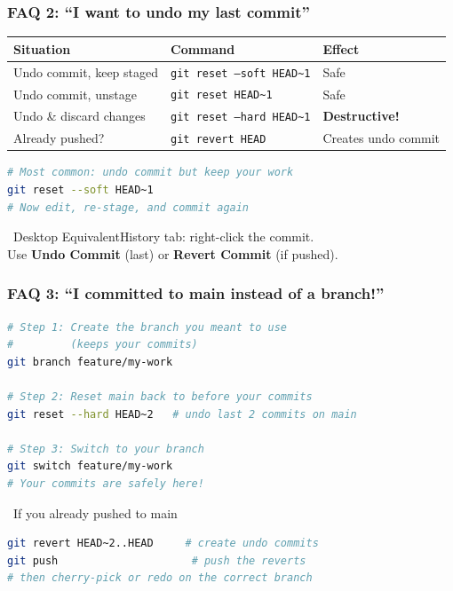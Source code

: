 \documentclass{beamer}
\newcommand{\desktoptip}[1]{\begin{block}{\faMousePointer\ Desktop Equivalent}#1\end{block}}
\begin{document}
\begin{frame}[fragile]
\frametitle{FAQ 2: ``I want to undo my last commit''}

\begin{table}[h]
\centering
\tiny
\begin{tabular}{p{}p{}p{}}
\toprule
\textbf{Situation} & \textbf{Command} & \textbf{Effect} \\
\midrule
Undo commit, keep staged & \texttt{git reset --soft HEAD\textasciitilde1} & Safe \\
Undo commit, unstage & \texttt{git reset HEAD\textasciitilde1} & Safe \\
Undo \& discard changes & \texttt{git reset --hard HEAD\textasciitilde1} & \textbf{Destructive!} \\
Already pushed? & \texttt{git revert HEAD} & Creates undo commit \\
\bottomrule
\end{tabular}
\end{table}

\begin{lstlisting}[language=bash]
# Most common: undo commit but keep your work
git reset --soft HEAD~1
# Now edit, re-stage, and commit again
\end{lstlisting}

\desktoptip{History tab: right-click the commit.\\Use \textbf{Undo Commit} (last) or \textbf{Revert Commit} (if pushed).}
\end{frame}

\begin{frame}[fragile]
\frametitle{FAQ 3: ``I committed to main instead of a branch!''}

\begin{lstlisting}[language=bash]
# Step 1: Create the branch you meant to use
#         (keeps your commits)
git branch feature/my-work

# Step 2: Reset main back to before your commits
git reset --hard HEAD~2   # undo last 2 commits on main

# Step 3: Switch to your branch
git switch feature/my-work
# Your commits are safely here!
\end{lstlisting}

\begin{alertblock}{\faExclamationTriangle\ If you already pushed to main}
\begin{lstlisting}[language=bash]
git revert HEAD~2..HEAD     # create undo commits
git push                     # push the reverts
# then cherry-pick or redo on the correct branch
\end{lstlisting}
\end{alertblock}
\end{frame}
\end{document}
